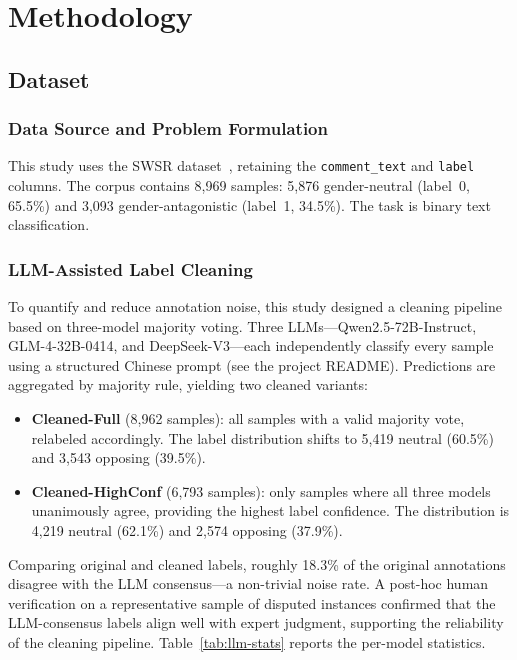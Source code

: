 ﻿\documentclass[12pt]{article}
\begin{document}
\section{Methodology}

\subsection{Dataset}

\subsubsection{Data Source and Problem Formulation}
This study uses the SWSR dataset~\cite{jiang2022swsr}, retaining the \texttt{comment\_text} and \texttt{label} columns. The corpus contains 8{,}969 samples: 5{,}876 gender-neutral (label~0, 65.5\%) and 3{,}093 gender-antagonistic (label~1, 34.5\%). The task is binary text classification.

\subsubsection{LLM-Assisted Label Cleaning}
\label{sec:llm-cleaning}
To quantify and reduce annotation noise, this study designed a cleaning pipeline based on three-model majority voting. Three LLMs---Qwen2.5-72B-Instruct, GLM-4-32B-0414, and DeepSeek-V3---each independently classify every sample using a structured Chinese prompt (see the project README). Predictions are aggregated by majority rule, yielding two cleaned variants:

\begin{itemize}
    \item \textbf{Cleaned-Full} (8{,}962 samples): all samples with a valid majority vote, relabeled accordingly. The label distribution shifts to 5{,}419 neutral (60.5\%) and 3{,}543 opposing (39.5\%).
    \item \textbf{Cleaned-HighConf} (6{,}793 samples): only samples where all three models unanimously agree, providing the highest label confidence. The distribution is 4{,}219 neutral (62.1\%) and 2{,}574 opposing (37.9\%).
\end{itemize}

Comparing original and cleaned labels, roughly 18.3\% of the original annotations disagree with the LLM consensus---a non-trivial noise rate. A post-hoc human verification on a representative sample of disputed instances confirmed that the LLM-consensus labels align well with expert judgment, supporting the reliability of the cleaning pipeline. Table~\ref{tab:llm-stats} reports the per-model statistics.
\end{document}
